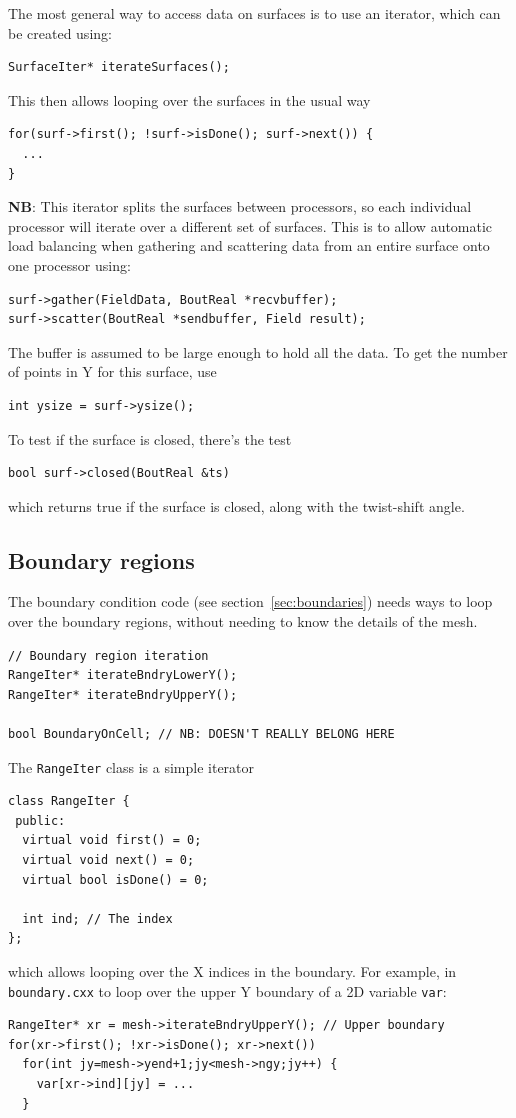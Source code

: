 \documentclass[12pt]{article}
\newcommand{\code}[1]{\texttt{#1}}
\begin{document}
The most general way to access data on surfaces is to use an
iterator, which can be created using:
\begin{lstlisting}
SurfaceIter* iterateSurfaces();
\end{lstlisting}
This then allows looping over the surfaces in the usual way
\begin{lstlisting}
for(surf->first(); !surf->isDone(); surf->next()) {
  ...
}
\end{lstlisting}
{\bf NB}: This iterator splits the surfaces between processors, so each
individual processor will iterate over a different set of surfaces. This
is to allow automatic load balancing when gathering and scattering data
from an entire surface onto one processor using:
\begin{lstlisting}
surf->gather(FieldData, BoutReal *recvbuffer);
surf->scatter(BoutReal *sendbuffer, Field result);
\end{lstlisting}
The buffer is assumed to be large enough to hold all the data. To 
get the number of points in Y for this surface, use
\begin{lstlisting}
int ysize = surf->ysize();
\end{lstlisting}
To test if the surface is closed, there's the test
\begin{lstlisting}
bool surf->closed(BoutReal &ts)
\end{lstlisting}
which returns true if the surface is closed, along with the twist-shift angle.

\subsection{Boundary regions}

The boundary condition code (see section~\ref{sec:boundaries}) needs
ways to loop over the boundary regions, without needing to know
the details of the mesh.

\begin{lstlisting}
// Boundary region iteration
RangeIter* iterateBndryLowerY();
RangeIter* iterateBndryUpperY();

bool BoundaryOnCell; // NB: DOESN'T REALLY BELONG HERE
\end{lstlisting}
  
The \code{RangeIter} class is a simple iterator 
\begin{lstlisting}
class RangeIter {
 public:
  virtual void first() = 0;
  virtual void next() = 0;
  virtual bool isDone() = 0;
  
  int ind; // The index
};
\end{lstlisting}
which allows looping over the X indices in the boundary. For example, in
\code{boundary.cxx} to loop over the upper Y boundary of a 2D variable
\code{var}:
\begin{lstlisting}
RangeIter* xr = mesh->iterateBndryUpperY(); // Upper boundary
for(xr->first(); !xr->isDone(); xr->next())
  for(int jy=mesh->yend+1;jy<mesh->ngy;jy++) {
    var[xr->ind][jy] = ...
  }
\end{lstlisting}
\end{document}

